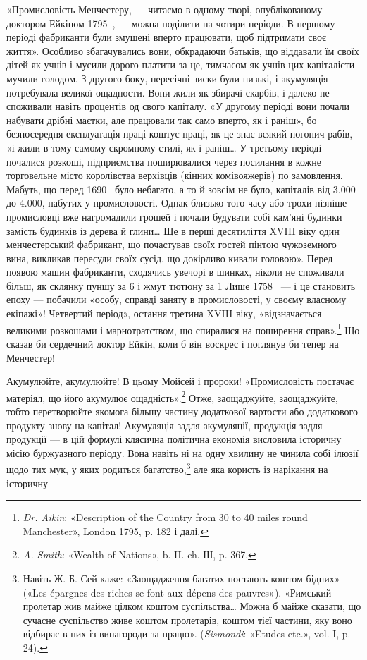 «Промисловість Менчестеру, — читаємо в одному творі, опублікованому
доктором Ейкіном 1795~, — можна поділити на
чотири періоди. В першому періоді фабриканти були змушені
вперто працювати, щоб підтримати своє життя». Особливо збагачувались
вони, обкрадаючи батьків, що віддавали їм своїх дітей
як учнів і мусили дорого платити за це, тимчасом як учнів цих
капіталісти мучили голодом. З другого боку, пересічні зиски
були низькі, і акумуляція потребувала великої ощадности.
Вони жили як збирачі скарбів, і далеко не споживали навіть
процентів од свого капіталу. «У другому періоді вони почали
набувати дрібні маєтки, але працювали так само вперто, як і
раніш», бо безпосередня експлуатація праці коштує праці, як
це знає всякий погонич рабів, «і жили в тому самому скромному
стилі, як і раніш\dots{} У третьому періоді почалися розкоші, підприємства
поширювалися через посилання в кожне торговельне
місто королівства верхівців (кінних комівояжерів) по замовлення.
Мабуть, що перед 1690~ було небагато, а то й зовсім не було,
капіталів від \num{3.000} до \num{4.000}, набутих у промисловості.
Однак близько того часу або трохи пізніше промисловці
вже нагромадили грошей і почали будувати собі кам’яні
будинки замість будинків із дерева й глини\dots{} Ще в перші десятиліття
XVIII віку один менчестерський фабрикант, що почастував
своїх гостей пінтою чужоземного вина, викликав пересуди
своїх сусід, що докірливо кивали головою». Перед появою машин
фабриканти, сходячись увечорі в шинках, ніколи не споживали
більш, як склянку пуншу за 6 і жмут тютюну за 1
Лише 1758~ — і це становить епоху — побачили «особу, справді
заняту в промисловості, у своєму власному екіпажі»! Четвертий
період», остання третина XVIII віку, «відзначається великими
розкошами і марнотратством, що спиралися на поширення
справ».\footnote{
\emph{Dr. Aikin}: «Description of the Country from 30 to 40 miles round
Manchester», London 1795, p. 182 і далі.
} Що сказав би сердечний доктор Ейкін, коли б він
воскрес і поглянув би тепер на Менчестер!

Акумулюйте, акумулюйте! В цьому Мойсей і пророки! «Промисловість
постачає матеріял, що його акумулює ощадність».\footnote{
\emph{A. Smith}: «Wealth of Nations», b. II. ch. ІІІ, p. 367.
}
Отже, заощаджуйте, заощаджуйте, тобто перетворюйте якомога
більшу частину додаткової вартости або додаткового продукту
знову на капітал! Акумуляція задля акумуляції, продукція
задля продукції — в цій формулі клясична політична економія
висловила історичну місію буржуазного періоду. Вона навіть ні
на одну хвилину не чинила собі ілюзії щодо тих мук, у яких родиться
багатство,\footnote{
Навіть Ж. Б. Сей каже: «Заощадження багатих постають коштом
бідних» («Les épargnes des riches se font aux dépens des pauvres»). «Римський
пролетар жив майже цілком коштом суспільства\dots{} Можна б майже
сказати, що сучасне суспільство живе коштом пролетарів, коштом тієї
частини, яку воно відбирає в них із винагороди за працю». (\emph{Sismondi}:
«Etudes etc.», vol. I, p. 24).
} але яка користь із нарікання на історичну
\parbreak{}  %

